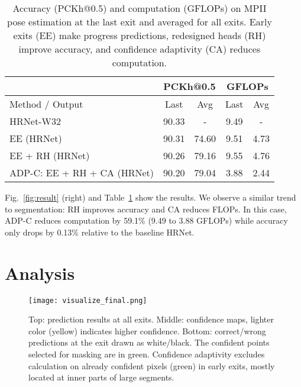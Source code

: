 \setlength{\tabcolsep}{4pt}
\renewcommand{\arraystretch}{1.2}
\begin{table}[h]
\centering
\small
\vspace{-1ex}
\begin{tabular}{l|cc|cc}
\hline
                        & \multicolumn{2}{c|}{PCKh@0.5} & \multicolumn{2}{c}{GFLOPs} \\ \hline
Method / Output         & Last                & Avg                & Last                & Avg                \\ \hline
HRNet-W32 \cite{wang2020deep}     & 90.33               & -                  & 9.49                & -                  \\ \hline
EE (HRNet)          & 90.31               & 74.60               & 9.51                & 4.73               \\ \hline
EE + RH (HRNet)    & 90.26               & 79.16              & 9.55                & 4.76               \\
ADP-C: EE + RH + CA (HRNet) & 90.20               & 79.04              & 3.88                & 2.44               \\ \hline
\end{tabular}
\caption{%
Accuracy (PCKh@0.5) and computation (GFLOPs) on MPII pose estimation at the last exit and averaged for all exits.
Early exits (EE) make progress predictions, redesigned heads (RH) improve accuracy, and confidence adaptivity (CA) reduces computation.
}
\label{tab:pose}
\end{table}
 
Fig.~\ref{fig:result} (right) and Table~\ref{tab:pose} show the results.
We observe a similar trend to segmentation: RH improves accuracy and CA reduces FLOPs.
In this case, ADP-C reduces computation by 59.1\% (9.49 to 3.88 GFLOPs) while accuracy only drops by 0.13\% relative to the baseline HRNet. 


\section{Analysis}
\label{sec:analysis}


\begin{figure}[h]
\texttt{[image: visualize\_final.png]}
\caption{%
Top: prediction results at all exits.
Middle: confidence maps, lighter color (yellow) indicates higher confidence.
Bottom: correct/wrong predictions at the exit drawn as white/black.
The confident points selected for masking are in green.
Confidence adaptivity excludes calculation on already confident pixels (green) in early exits, mostly located at inner parts of large segments.}
\label{fig:vis}
\end{figure}


